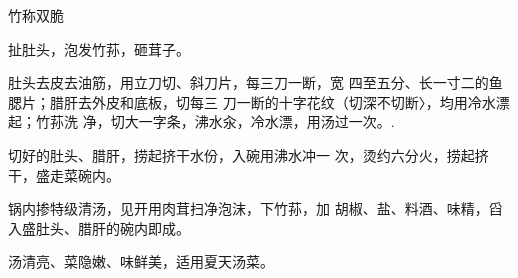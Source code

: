 \begin{recipe}{竹称双脆}

\ingredients



\cooking

\step 扯肚头，泡发竹荪，砸茸子。	\

肚头去皮去油筋，用立刀切、斜刀片，每三刀一断，宽 四至五分、长一寸二的鱼腮片；腊肝去外皮和底板，切每三 刀一断的十字花纹（切深不切断〉，均用冷水漂起；竹荪洗 净，切大一字条，沸水汆，冷水漂，用汤过一次。.

\step 	切好的肚头、腊肝，捞起挤干水份，入碗用沸水冲一 次，烫约六分火，捞起挤干，盛走菜碗内。

\step 	锅内掺特级清汤，见开用肉茸扫净泡沫，下竹荪，加 胡椒、盐、料酒、味精，舀入盛肚头、腊肝的碗内即成。

\notes

汤清亮、菜隐嫩、味鲜美，适用夏天汤菜。

\end{recipe}

